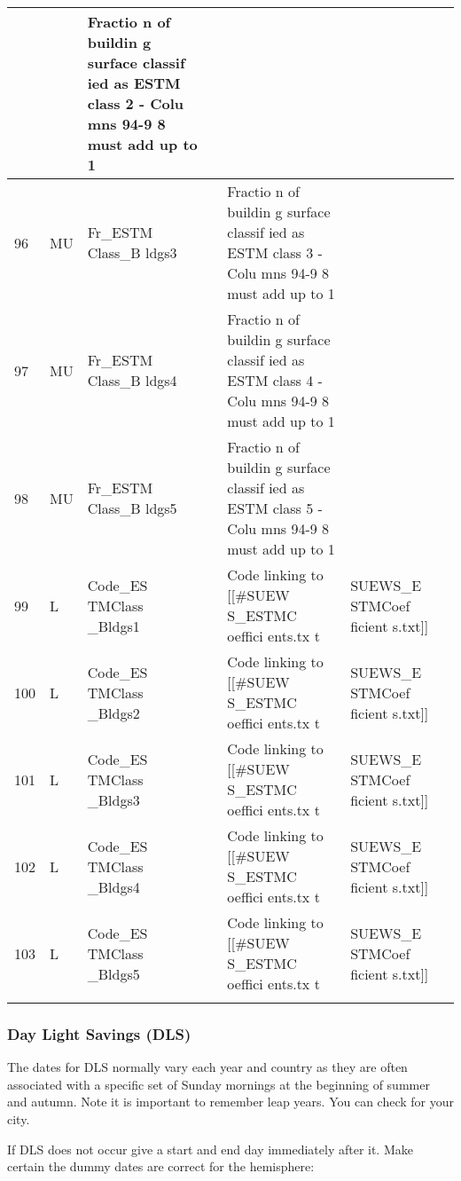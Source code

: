 \documentclass[letterpaper,10pt,english]{sphinxmanual}
\begin{document}
\begin{savenotes}
\begin{longtable}{|l|l|l|l|l|l|l|}
&&
Fractio
n
of
buildin
g
surface
classif
ied
as ESTM
class 2
-  Colu
mns
94-9
8
must
add
up
to 1
&&\\
\hline
96
&
MU
&
Fr\_ESTM
Class\_B
ldgs3
&&
Fractio
n
of
buildin
g
surface
classif
ied
as ESTM
class 3
-  Colu
mns
94-9
8
must
add
up
to 1
&&\\
\hline
97
&
MU
&
Fr\_ESTM
Class\_B
ldgs4
&&
Fractio
n
of
buildin
g
surface
classif
ied
as ESTM
class 4
-  Colu
mns
94-9
8
must
add
up
to 1
&&\\
\hline
98
&
MU
&
Fr\_ESTM
Class\_B
ldgs5
&&
Fractio
n
of
buildin
g
surface
classif
ied
as ESTM
class 5
-  Colu
mns
94-9
8
must
add
up
to 1
&&\\
\hline
99
&
L
&
Code\_ES
TMClass
\_Bldgs1
&&
Code
linking
to
{[}{[}\#SUEW
S\_ESTMC
oeffici
ents.tx
t
&
SUEWS\_E
STMCoef
ficient
s.txt{]}{]}
&\\
\hline
100
&
L
&
Code\_ES
TMClass
\_Bldgs2
&&
Code
linking
to
{[}{[}\#SUEW
S\_ESTMC
oeffici
ents.tx
t
&
SUEWS\_E
STMCoef
ficient
s.txt{]}{]}
&\\
\hline
101
&
L
&
Code\_ES
TMClass
\_Bldgs3
&&
Code
linking
to
{[}{[}\#SUEW
S\_ESTMC
oeffici
ents.tx
t
&
SUEWS\_E
STMCoef
ficient
s.txt{]}{]}
&\\
\hline
102
&
L
&
Code\_ES
TMClass
\_Bldgs4
&&
Code
linking
to
{[}{[}\#SUEW
S\_ESTMC
oeffici
ents.tx
t
&
SUEWS\_E
STMCoef
ficient
s.txt{]}{]}
&\\
\hline
103
&
L
&
Code\_ES
TMClass
\_Bldgs5
&&
Code
linking
to
{[}{[}\#SUEW
S\_ESTMC
oeffici
ents.tx
t
&
SUEWS\_E
STMCoef
ficient
s.txt{]}{]}
&\\
\hline&&&&&&\\
\hline
\end{longtable}\sphinxatlongtableend\end{savenotes}


\subsubsection{Day Light Savings (DLS)}
\label{\detokenize{input_files/SUEWS_SiteInfo/SUEWS_SiteSelect:day-light-savings-dls}}
The dates for DLS normally vary each year and country as they are often
associated with a specific set of Sunday mornings at the beginning of
summer and autumn. Note it is important to remember leap years. You can
check  for your city.

If DLS does not occur give a start and end day immediately after it.
Make certain the dummy dates are correct for the hemisphere:
\end{document}
